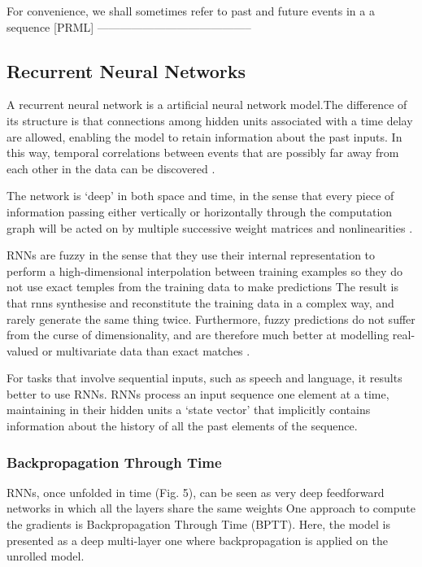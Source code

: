 For convenience, we shall sometimes refer to past and future events in a a sequence
[PRML]
-----------------------------------------

\subsection{Recurrent Neural Networks}
A recurrent neural network is a artificial neural network model.The difference of its structure is that connections among hidden units associated with a time delay are allowed, enabling the model to retain information about the past inputs. In this way, temporal correlations between events that are possibly far away from each other in the data can be discovered \cite{pascanu2013difficulty}. 

The network is `deep' in both space and time, in the sense that every piece of information passing either vertically or horizontally through the computation graph will be acted on by multiple successive weight matrices and nonlinearities \cite{graves2013generating}.

RNNs are fuzzy in the sense that they use their internal representation to perform a high-dimensional interpolation between training examples so they do not use exact temples from the training data to make predictions \cite{graves2013generating}
The result is that rnns synthesise and reconstitute the training data in a complex way, and rarely generate the same thing twice. Furthermore, fuzzy predictions do not suffer from the curse of dimensionality, and are therefore much better at modelling real-valued or multivariate data than exact matches  \cite{graves2013generating}.

For tasks that involve sequential inputs, such as speech and language, it results better to use RNNs. RNNs process an input sequence one element at a time, maintaining in their hidden units a ‘state vector’ that implicitly contains information about the history of all the past elements of the sequence.\cite{lecun2015deep}


\subsubsection{Backpropagation Through Time}

RNNs, once unfolded in time (Fig. 5), can be seen as very deep feedforward networks in which all the layers share the same weights\cite{lecun2015deep}
One approach to compute the gradients is Backpropagation Through Time (BPTT). Here, the model is presented as a deep multi-layer one where backpropagation is applied on the unrolled model\cite{pascanu2013difficulty}.


